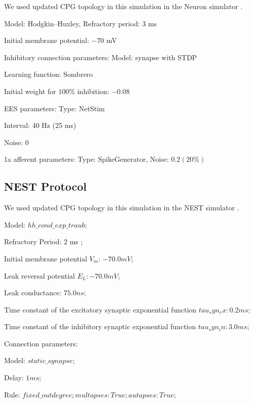 \documentclass[]{elsarticle}
\newcommand\rewrite[1]{\todo{rewrite #1}}
\begin{document}
We used updated CPG topology in this simulation in the Neuron simulator \cite{NeuronSimulator}. \rewrite{}
\begin{description}
	\item Model: Hodgkin–Huxley, Refractory period: 3 ms
	\item Initial membrane potential: $-70$ mV
	\item Inhibitory connection parameters: Model: synapse with STDP
	\item Learning function: Sombrero
	\item Initial weight for $100\%$ inhibition: $-0.08$
	\item EES parameters: Type: NetStim
	\item Interval: 40 Hz (25 ms)
	\item Noise: 0
	\item 1a afferent parameters: Type: SpikeGenerator, Noise: $0.2 (20\%)$
\end{description}

\subsection{NEST Protocol} 

We used updated CPG topology in this simulation in the NEST simulator \cite{Gewaltig:NEST}. \rewrite{}

\begin{description}
	\item Model: $hh\_cond\_exp\_traub$;
	\item Refractory Period: 2 ms \cite{borg1984};
	\item Initial membrane potential $V_m$: $-70.0 mV$; 
	\item Leak reversal potential $E_L: -70.0 mV$; 
	\item Leak conductance: $75.0 ns$;
	\item Time constant of the excitatory synaptic exponential function $tau_syn_ex: 0.2 ms$;
	\item Time constant of the inhibitory synaptic exponential function $tau_syn_in: 3.0 ms$; 
	\item Connection parameters:
	\item Model: $static\_synapse$;
	\item Delay: $1 ms$;
	\item Rule: $fixed\_outdegree; multapses: True; autapses: True$;
\end{description}
\end{document}
